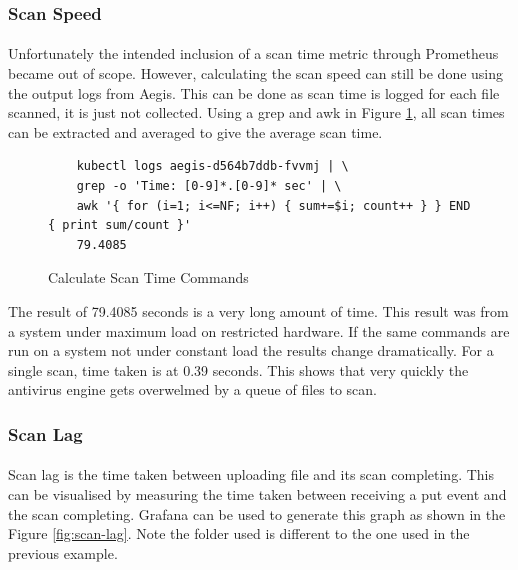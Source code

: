 \documentclass[12pt, conference, final, a4paper, onecolumn, compsoc]{IEEEtran}
\begin{document}
\subsubsection*{Scan Speed}
\paragraph{}
Unfortunately the intended inclusion of a scan time metric through Prometheus
became out of scope. However, calculating the scan speed can still be done using
the output logs from Aegis. This can be done as scan time is logged for each
file scanned, it is just not collected. Using a grep and awk in Figure \ref{fig:scan-time-commands}, all scan times
can be extracted and averaged to give the average scan time.

\begin{figure}[H]
  \begin{lstlisting}
    kubectl logs aegis-d564b7ddb-fvvmj | \
    grep -o 'Time: [0-9]*.[0-9]* sec' | \
    awk '{ for (i=1; i<=NF; i++) { sum+=$i; count++ } } END { print sum/count }'
    79.4085
  \end{lstlisting}
    \caption{Calculate Scan Time Commands}
    \label{fig:scan-time-commands}
\end{figure}

The result of 79.4085 seconds is a very long amount of time. This result was
from a system under maximum load on restricted hardware. If the same commands
are run on a system not under constant load the results change dramatically. For
a single scan, time taken is at 0.39 seconds. This shows that very quickly the
antivirus engine gets overwelmed by a queue of files to scan.

\subsubsection*{Scan Lag}
\paragraph{}
Scan lag is the time taken between uploading file and its scan completing. This can
be visualised by measuring the time taken between receiving a put event and
the scan completing. Grafana can be used to generate this graph as shown in the
Figure \ref{fig:scan-lag}. Note the folder used is different to the one used in the
previous example.
\end{document}
